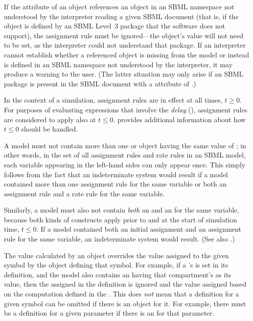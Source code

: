 \begin{blockChanged}

If the  attribute of an \AssignmentRule object references an object in an SBML namespace not understood by the interpreter reading a given SBML document (that is, if the object is defined by an SBML Level~3 package that the software does not support), the assignment rule must be ignored---the object's value will not need to be set, as the interpreter could not understand that package.  If an interpreter cannot establish whether a referenced object is missing from the model or instead is defined in an SBML namespace not understood by the interpreter, it may produce a warning to the user.  (The latter situation may only arise if an SBML package is present in the SBML document with a  attribute of .)

\end{blockChanged}

In the context of a simulation, assignment rules are in effect at
all times, $t \geq 0$.  For purposes of evaluating expressions
that involve the \emph{delay} 
(), assignment rules are considered
to apply also at $t \leq 0$.   provides
additional information about how $t \leq 0$ should be
  handled.

A model must not contain more than one \AssignmentRule or
\RateRule object having the same value of ; in
other words, in the set of all assignment rules and rate rules in
an SBML model, each variable appearing in the left-hand sides can
only appear once.  This simply follows from the fact that an
indeterminate system would result if a model contained more than
one assignment rule for the same variable or both an assignment
rule and a rate rule for the same variable.

Similarly, a model must also not contain \emph{both} an
\AssignmentRule and an \InitialAssignment for the same variable,
because both kinds of constructs apply prior to and at the start
of simulation time, \ie $t \leq 0$.  If a model contained both an
initial assignment and an assignment rule for the same variable,
an indeterminate system would result.  (See also
.)

The value calculated by an \AssignmentRule object overrides the
value assigned to the given symbol by the object defining that
symbol.  For example, if a \Compartment's  is set in
its definition, and the model also contains an \AssignmentRule
having that compartment's  as its 
value, then the  assigned in the \Compartment
definition is ignored and the value assigned based on the
computation defined in the \AssignmentRule.  This does \emph{not}
mean that a definition for a given symbol can be omitted if there
is an \AssignmentRule object for it.  For example, there must be a
\Parameter definition for a given parameter if there is an
\AssignmentRule for that parameter.


